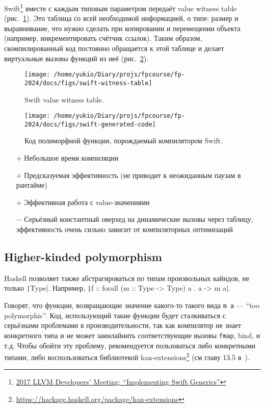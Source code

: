 \documentclass[12pt]{article}
\newcommand{\positive}{$+$} %
\newcommand{\negative}{{\color{red} $-$}} %
\begin{document}
    Swift\footnote{\href{https://youtu.be/ctS8FzqcRug?si=y_ZYnuUOulA33d_X}{2017 LLVM Developers’ Meeting: ``Implementing Swift Generics''}} вместе с каждым типовым параметром передаёт value witness table (рис.~\ref{fig:swift-witness-table}).
    Это таблица со всей необходимой информацией, о типе: размер и выравнивание, что нужно сделать при копировании и перемещении объекта (например, инкрементировать счётчик ссылок).
    Таким образом, скомпилированный код постоянно обращается к этой таблице и делает виртуальные вызовы функций из неё (рис.~\ref{fig:swift-generated-code}).
    \begin{figure}
        \centering
        \texttt{[image: /home/yukio/Diary/projs/fpcourse/fp-2024/docs/figs/swift-witness-table]}
        \caption{Swift value witness table.}
        \label{fig:swift-witness-table}
    \end{figure}
    \begin{figure}
        \centering
        \texttt{[image: /home/yukio/Diary/projs/fpcourse/fp-2024/docs/figs/swift-generated-code]}
        \caption{Код полиморфной функции, порождаемый компилятором Swift.}
        \label{fig:swift-generated-code}
    \end{figure}

    \begin{itemize}
        \item[\positive] Небольшое время компиляции
        \item[\positive] Предсказуемая эффективность (не приводит к неожиданным паузам в рантайме)
        \item[\positive] Эффективная работа с value-значениями
        \item[\negative] Серьёзный константный оверхед на динамические вызовы через таблицу, эффективность очень сильно зависит от компиляторных оптимизаций
    \end{itemize}

    \subsection{Higher-kinded polymorphism}

    Haskell позволяет также абстрагироваться по типам произвольных кайндов, не только \texttt|Type|.
    Например, \texttt|f :: forall (m :: Type -> Type) a . a -> m a|.

    Говорят, что функции, возвращающие значение какого-то такого вида \texttt{m a} --- ``too polymorphic''.
    Код, использующий такие функции будет сталкиваться с серьёзнами проблемами в производительности, так как компилятор не знает конкретного типа и не может заинлайнить соответствующие вызовы \texttt{fmap}, bind, и т.д.
    Чтобы обойти эту проблему, рекомендуется пользоваться либо конкретными типами, либо воспользоваться библиотекой kan-extensions\footnote{\url{https://hackage.haskell.org/package/kan-extensions}} (см главу 13.5 в~\cite{maguire-types}).
\end{document}
